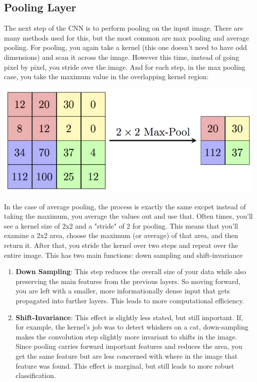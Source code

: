 \documentclass{article}
\begin{document}
    \subsection{Pooling Layer}
        The next step of the CNN is to perform pooling on the input image. There are many methods used for this, but the most common are max pooling and average pooling. For pooling, you again take a kernel (this one doesn't need to have odd dimensions) and scan it across the image. However this time, instead of going pixel by pixel, you stride over the image. And for each step, in the max pooling case, you take the maximum value in the overlapping kernel region:
        
        \begin{center}
            \includegraphics{images/maxpool.png}
        \end{center}
        
        In the case of average pooling, the process is exactly the same excpet instead of taking the maximum, you average the values out and use that. Often times, you'll see a kernel size of 2x2 and a "stride" of 2 for pooling. This means that you'll examine a 2x2 area, choose the maximum (or average) of that area, and then return it. After that, you stride the kernel over two steps and repeat over the entire image. This has two main functions: down sampling and shift-invariance
        
        \begin{enumerate}
            \item \textbf{Down Sampling}: This step reduces the overall size of your data while also preserving the main features from the previous layers. So moving forward, you are left with a smaller, more informationally dense input that gets propagated into further layers. This leads to more computational efficiency.
            \item \textbf{Shift-Invariance}: This effect is slightly less stated, but still important. If, for example, the kernel's job was to detect whiskers on a cat, down-sampling makes the convolution step slightly more invariant to shifts in the image. Since pooling carries forward important features and reduces the area, you get the same feature but are less concerned with where in the image that feature was found. This effect is marginal, but still leads to more robust classification.
        \end{enumerate}
\end{document}
